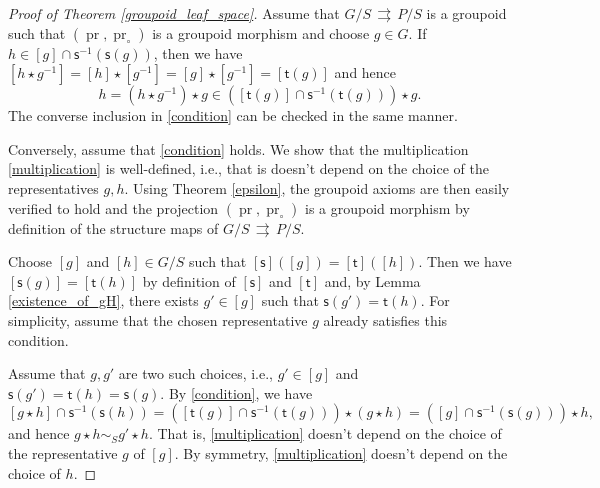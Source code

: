 \documentclass{amsart}
\theoremstyle{definition}
\begin{document}
\begin{proof}[Proof of Theorem \ref{groupoid_leaf_space}]
Assume that
 $G/S\,{{\rightrightarrows}}\, P/S$ is a groupoid such that $(\operatorname{pr},\operatorname{pr}_\circ)$ is a groupoid morphism and choose $g\in G$.
If $h\in [g]\cap{{\mathsf{s}}}{^{-1}}({{\mathsf{s}}}(g))$, then 
we have $[h\star g{^{-1}}]=[h]\star[g{^{-1}}]=[g]\star[g{^{-1}}]
=[{{\mathsf{t}}}(g)]$
and hence 
\[h=(h\star g{^{-1}})\star g\in ( [{{\mathsf{t}}}(g)]\cap {{\mathsf{s}}}{^{-1}}({{\mathsf{t}}}(g)))\star g.\]
The converse inclusion in \eqref{condition} can be checked in the same manner.

\medskip

Conversely, assume 
that  \eqref{condition} holds.
We show that the multiplication \eqref{multiplication} is well-defined, i.e., that is doesn't depend 
on the choice of the representatives $g,h$.
Using Theorem \ref{epsilon}, the groupoid axioms are then easily verified to hold
and the projection $(\operatorname{pr},\operatorname{pr}_\circ)$ is a groupoid morphism by definition of the structure maps 
of $G/S\,{{\rightrightarrows}}\, P/S$.

Choose $[g]$ and $[h]\in G/S$ such that $[{{\mathsf{s}}}]([g])=[{{\mathsf{t}}}]([h])$. Then 
we have $[{{\mathsf{s}}}(g)]=[{{\mathsf{t}}}(h)]$ by definition of $[{{\mathsf{s}}}]$ and $[{{\mathsf{t}}}]$ and,  by
Lemma \ref{existence_of_gH}, there 
exists $g'\in [g]$ such that ${{\mathsf{s}}}(g')={{\mathsf{t}}}(h)$. For simplicity, assume that 
the chosen representative $g$ already satisfies this condition. 

Assume that $g,g'$ are two such choices, i.e., $g'\in[g]$ and ${{\mathsf{s}}}(g')={{\mathsf{t}}}(h)={{\mathsf{s}}}(g)$.
By \eqref{condition}, we have
\[[g\star h]\cap {{\mathsf{s}}}{^{-1}}({{\mathsf{s}}}(h))= \left([{{\mathsf{t}}}(g)]\cap{{\mathsf{s}}}{^{-1}}({{\mathsf{t}}}(g))\right) \star (g\star h)
= \left([g]\cap {{\mathsf{s}}}{^{-1}}({{\mathsf{s}}}(g))\right)\star h,
\]
and hence
$g\star h \sim_S g'\star h$. That is, 
\eqref{multiplication} doesn't depend on the choice of the representative $g$
of $[g]$. 
By symmetry, \eqref{multiplication} doesn't depend on the choice of $h$.
\end{proof}
\end{document}
